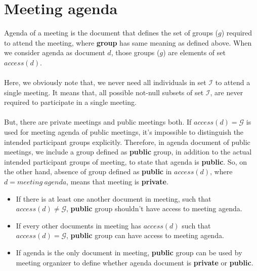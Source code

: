 \documentclass{article}
\begin{document}
\section{Meeting agenda}
\noindent
Agenda of a meeting is the document that defines the set of groups ($g$) required to attend the meeting, where \textbf{group} has same meaning as defined above.
When we consider agenda as document $d$, those groups ($g$) are elements of set $access(d)$.\\ \\
Here, we obviously note that, we never need all individuals in set $\mathcal{I}$ to attend a single meeting. It means that, all possible not-null subsets of set $\mathcal{I}$, are never required to participate in a single meeting. \\ \\
But, there are private meetings and public meetings both. If $access(d) = \mathcal{G}$ is used for meeting agenda of public meetings, it's impossible to distinguish the intended participant groups explicitly. Therefore, in agenda document of public meetings, we include a group defined as \textbf{public} group, in addition to the actual intended participant groups of meeting, to state that agenda is \textbf{public}. So, on the other hand, absence of group defined as \textbf{public} in $access(d)$, where $d = meeting\ agenda$, means that meeting is \textbf{private}.
\begin{itemize}
    \item If there is at least one another document in meeting, such that $access(d) \ne \mathcal{G}$, \textbf{public} group shouldn't have access to meeting agenda.
    \item If every other documents in meeting has $access(d)$ such that $access(d) = \mathcal{G}$, \textbf{public} group can have access to meeting agenda.
    \item If agenda is the only document in meeting, \textbf{public} group can be used by meeting organizer to define whether agenda document is \textbf{private} or \textbf{public}.
\end{itemize}
\end{document}
